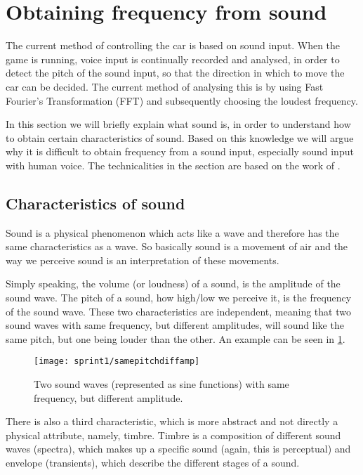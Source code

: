 \section{Obtaining frequency from sound}
The current method of controlling the car is based on sound input.
When the game is running, voice input is continually recorded and analysed, in order to detect the pitch of the sound input, so that the direction in which to move the car can be decided.
The current method of analysing this is by using Fast Fourier's Transformation (FFT) and subsequently choosing the loudest frequency.

In this section we will briefly explain what sound is, in order to understand how to obtain certain characteristics of sound.
Based on this knowledge we will argue why it is difficult to obtain frequency from a sound input, especially sound input with human voice.
The technicalities in the section are based on the work of \citet*{music-and-computers}.

\subsection{Characteristics of sound}
Sound is a physical phenomenon which acts like a wave and therefore has the same characteristics as a wave.
So basically sound is a movement of air and the way we perceive sound is an interpretation of these movements.

Simply speaking, the volume (or loudness) of a sound, is the amplitude of the sound wave.
The pitch of a sound, how high/low we perceive it, is the frequency of the sound wave.
These two characteristics are independent, meaning that two sound waves with same frequency, but different amplitudes, will sound like the same pitch, but one being louder than the other.
An example can be seen in \cref{fig:samepitchdiffamp}.

\begin{figure}[h]
\centering
\texttt{[image: sprint1/samepitchdiffamp]}
\caption{Two sound waves (represented as sine functions) with same frequency, but different amplitude.}
\label{fig:samepitchdiffamp}
\end{figure}

There is also a third characteristic, which is more abstract and not directly a physical attribute, namely, timbre.
Timbre is a composition of different sound waves (spectra), which makes up a specific sound (again, this is perceptual) and envelope (transients), which describe the different stages of a sound.
